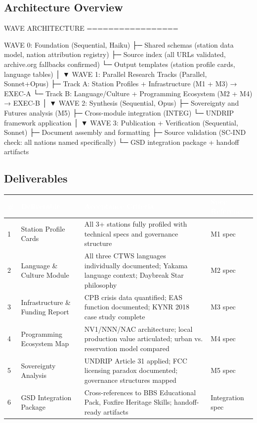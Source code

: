 \documentclass[11pt,letterpaper]{article}
\newcommand{\tableheader}[1]{\textbf{\sffamily\textcolor{white}{#1}}}
\begin{document}
\subsection{Architecture Overview}

\begin{asciibox}
WAVE ARCHITECTURE
=================

  WAVE 0: Foundation (Sequential, Haiku)
  ├─ Shared schemas (station data model, nation attribution registry)
  ├─ Source index (all URLs validated, archive.org fallbacks confirmed)
  └─ Output templates (station profile cards, language tables)
          │
          ▼
  WAVE 1: Parallel Research Tracks (Parallel, Sonnet+Opus)
  ├─ Track A: Station Profiles + Infrastructure (M1 + M3) → EXEC-A
  └─ Track B: Language/Culture + Programming Ecosystem (M2 + M4) → EXEC-B
          │
          ▼
  WAVE 2: Synthesis (Sequential, Opus)
  ├─ Sovereignty and Futures analysis (M5)
  ├─ Cross-module integration (INTEG)
  └─ UNDRIP framework application
          │
          ▼
  WAVE 3: Publication + Verification (Sequential, Sonnet)
  ├─ Document assembly and formatting
  ├─ Source validation (SC-IND check: all nations named specifically)
  └─ GSD integration package + handoff artifacts
\end{asciibox}

\subsection{Deliverables}

\begin{center}
\begin{tabularx}{\textwidth}{C{0.4cm}L{3.5cm}L{4cm}L{4cm}}
\toprule
{}
\tableheader{\#} & \tableheader{Deliverable} & \tableheader{Acceptance Criteria} & \tableheader{Spec Reference} \\
 & Station Profile Cards & All 3+ stations fully profiled with technical specs and governance structure & M1 spec \\
2 & Language \& Culture Module & All three CTWS languages individually documented; Yakama language context; Daybreak Star philosophy & M2 spec \\
3 & Infrastructure \& Funding Report & CPB crisis data quantified; EAS function documented; KYNR 2018 case study complete & M3 spec \\
4 & Programming Ecosystem Map & NV1/NNN/NAC architecture; local production value articulated; urban vs. reservation model compared & M4 spec \\
5 & Sovereignty Analysis & UNDRIP Article 31 applied; FCC licensing paradox documented; governance structures mapped & M5 spec \\
6 & GSD Integration Package & Cross-references to BBS Educational Pack, Foxfire Heritage Skills; handoff-ready artifacts & Integration spec \\
\bottomrule
\end{tabularx}
\end{center}
\end{document}
